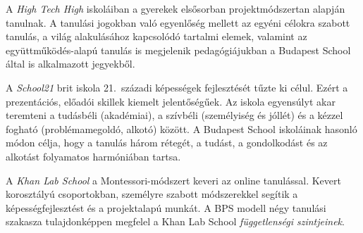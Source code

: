 A %
{\emph{High Tech High}} iskoláiban
a gyerekek elsősorban projektmódszertan alapján tanulnak. A tanulási
jogokban való egyenlőség mellett az egyéni célokra szabott tanulás, a
világ alakulásához kapcsolódó tartalmi elemek, valamint az
együttműködés-alapú tanulás is megjelenik pedagógiájukban a Budapest
School által is alkalmazott jegyekből.

A %
{\emph{School21}} brit iskola
21.~századi képességek fejlesztését tűzte ki célul. Ezért a
prezentációs, előadói skillek kiemelt jelentőségűek. Az iskola
egyensúlyt akar teremteni a tudásbéli (akadémiai), a szívbéli
(személyiség és jóllét) és a kézzel fogható (problémamegoldó, alkotó)
között. A Budapest School iskoláinak hasonló módon célja, hogy a tanulás
három rétegét, a tudást, a gondolkodást és az alkotást folyamatos
harmóniában tartsa.

A %
{\emph{Khan Lab School}} a
Montessori-módszert keveri az online tanulással. Kevert korosztályú
csoportokban, személyre szabott módszerekkel segítik a
képességfejlesztést és a projektalapú munkát. A BPS modell négy tanulási
szakasza tulajdonképpen megfelel a Khan Lab School
{\emph{függetlenségi
szintjeinek}}.
